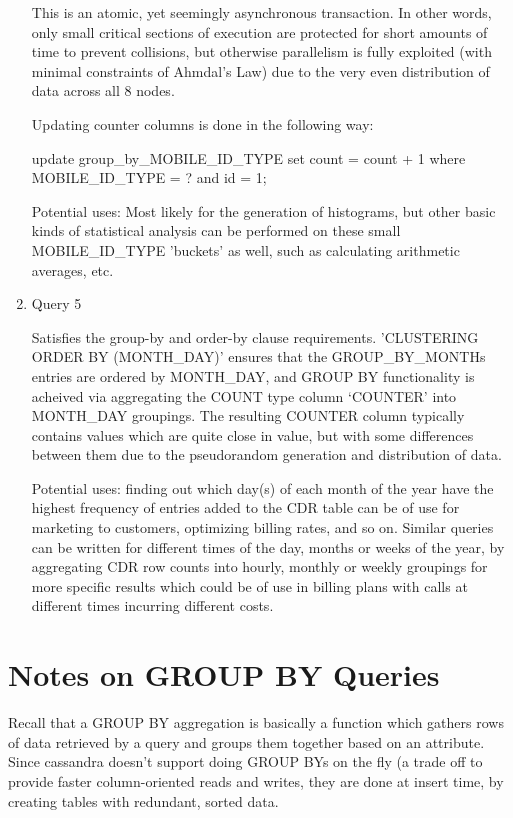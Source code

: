 \documentclass[letterpaper]{article}
\begin{document}
\begin{enumerate}
		This is an atomic, yet seemingly asynchronous transaction. In other words, only
		small critical sections of execution are protected for short amounts of time
		to prevent collisions, but otherwise parallelism is fully exploited (with minimal
		constraints of Ahmdal's Law) due to the very even distribution of data across all 
		8 nodes. 

		Updating counter columns is done in the following way:

		update group\_by\_MOBILE\_ID\_TYPE set count = count + 1  where MOBILE\_ID\_TYPE = ? and id = 1;

		Potential uses: Most likely for the generation of histograms, but other basic
		kinds of statistical analysis can be performed on these small MOBILE\_ID\_TYPE 
		'buckets' as well, such as calculating arithmetic averages, etc.

	\item Query 5
		

		Satisfies the group-by and order-by clause requirements. 
		'CLUSTERING ORDER BY (MONTH\_DAY)' ensures that the GROUP\_BY\_MONTHs entries are ordered
		by MONTH\_DAY, and GROUP BY functionality is acheived via aggregating the COUNT type
		column `COUNTER' into MONTH\_DAY groupings. The resulting COUNTER column typically
		contains values which are quite close in value, but with some differences between
		them due to the pseudorandom generation and distribution of data.

		Potential uses: finding out which day(s) of each month of the year have the highest
		frequency of entries added to the CDR table can be of use for marketing to customers,
		optimizing billing rates, and so on. Similar queries can be written for different
		times of the day, months or weeks of the year, by aggregating CDR row counts into 
		hourly, monthly or weekly groupings for more specific results which could be of use 
		in billing plans with calls at different times incurring different costs.
\end{enumerate}

\section{Notes on GROUP BY Queries}
Recall that a GROUP BY aggregation is basically a function which
gathers rows of data retrieved by a query and groups them
together based on an attribute. Since cassandra doesn't support doing
GROUP BYs on the fly (a trade off to provide faster column-oriented reads and
writes, they are done at insert time, by creating tables with redundant,
sorted data.
\end{document}
